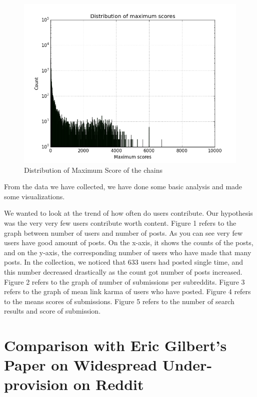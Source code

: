 \documentclass{article} %
\begin{document}
\begin{figure}[h]
\begin{center}
\includegraphics[width=5in]{max_score_distribution.png}
\caption{Distribution of Maximum Score of the chains}
\end{center}
\end{figure}

From the data we have collected, we have done some basic analysis and made some visualizations.

We wanted to look at the trend of how often do users contribute. Our hypothesis was the very very few users contribute worth content. Figure 1 refers to the graph between number of users and number of posts. As you can see very few users have good amount of posts. On the x-axis, it shows the counts of the posts, and on the y-axis, the corresponding number of users who have made that many posts. In the collection, we noticed that 633 users had posted single time, and this number decreased drastically as the count got number of posts increased. Figure 2 refers to the graph of number of submissions per subreddits. Figure 3 refers to the graph of mean link karma of users who have posted. Figure 4 refers to the means scores of submissions. Figure 5 refers to the number of search results and score of submission.

\section{Comparison with Eric Gilbert's Paper on Widespread Under-provision on Reddit}
\end{document}
